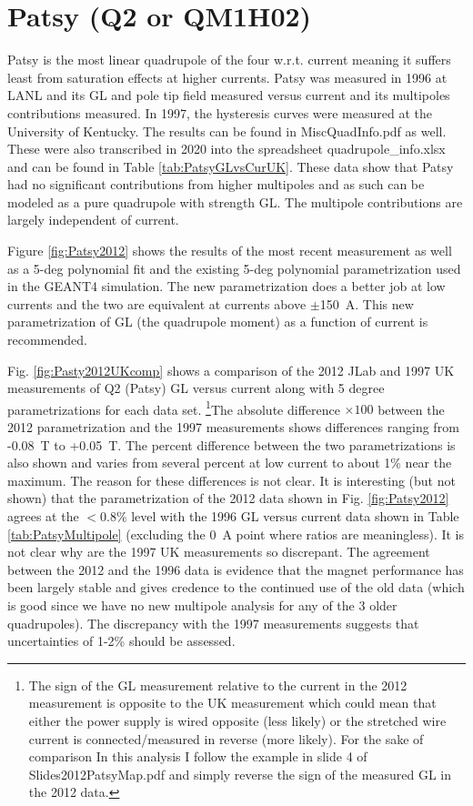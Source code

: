 \documentclass[12pt]{article}
\begin{document}
\section{Patsy (Q2 or QM1H02)}
Patsy is the most linear quadrupole of the four w.r.t. current meaning it suffers least from saturation effects at higher currents. Patsy was measured in 1996 at LANL and its GL and pole tip field measured versus current and its multipoles contributions measured. In 1997, the hysteresis curves were measured at the University of Kentucky. The results can be found in MiscQuadInfo.pdf as well. These were also transcribed in 2020 into the spreadsheet quadrupole\_info.xlsx and can be found in Table \ref{tab:PatsyGLvsCurUK}. These data show that Patsy had no significant contributions from higher multipoles and as such can be modeled as a pure quadrupole with strength GL. The multipole contributions are largely independent of current.


Figure \ref{fig:Patsy2012} shows the results of the most recent measurement as well as a 5-deg polynomial fit and the existing 5-deg polynomial parametrization used in the GEANT4 simulation. The new parametrization does a better job at low currents and the two are equivalent at currents above $\pm$150~A. This new parametrization of GL (the quadrupole moment) as a function of current is recommended.

Fig. \ref{fig:Pasty2012UKcomp} shows a comparison of the 2012 JLab and 1997 UK measurements of Q2 (Patsy) GL versus current along with 5 degree parametrizations for each data set. \footnote{The sign of the GL measurement relative to the current in the 2012 measurement is opposite to the UK measurement which could mean that either the power supply is wired opposite (less likely) or the stretched wire current is connected/measured in reverse (more likely). For the sake of comparison In this analysis I follow the example in slide 4 of Slides2012PatsyMap.pdf and simply reverse the sign of the measured GL in the 2012 data. }The absolute difference $\times100$ between the 2012 parametrization and the 1997 measurements shows differences ranging from -0.08~T to +0.05~T. The percent difference between the two parametrizations is also shown and varies from several percent at low current to about 1\% near the maximum. The reason for these differences is not clear. It is interesting (but not shown) that the parametrization of the 2012 data shown in Fig. \ref{fig:Patsy2012} agrees at the $<0.8\%$ level with the 1996 GL versus current data shown in Table \ref{tab:PatsyMultipole} (excluding the 0~A point where ratios are meaningless). It is not clear why are the 1997 UK measurements so discrepant. The agreement between the 2012 and the 1996 data is evidence that the magnet performance has been largely stable and gives credence to the continued use of the old data (which is good since we have no new multipole analysis for any of the 3 older quadrupoles). The discrepancy with the 1997 measurements suggests that uncertainties of 1-2\% should be assessed. 
\end{document}
